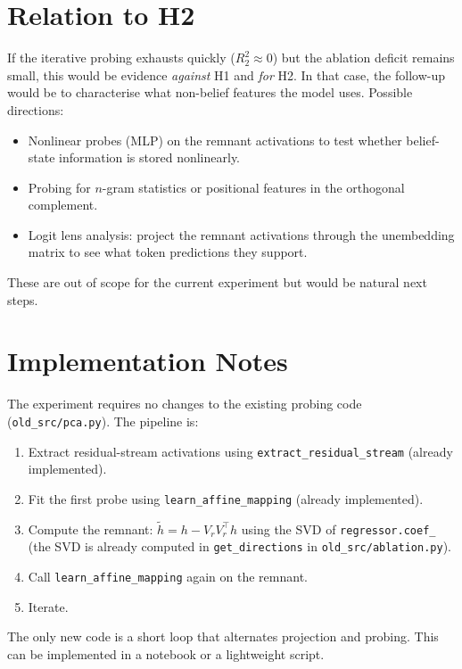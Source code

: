 \documentclass[11pt]{article}
\begin{document}
\section{Relation to H2}

If the iterative probing exhausts quickly ($R^2_2 \approx 0$) but the ablation deficit remains small, this would be evidence \emph{against} H1 and \emph{for} H2.  In that case, the follow-up would be to characterise what non-belief features the model uses.  Possible directions:
\begin{itemize}
  \item Nonlinear probes (MLP) on the remnant activations to test whether belief-state information is stored nonlinearly.
  \item Probing for $n$-gram statistics or positional features in the orthogonal complement.
  \item Logit lens analysis: project the remnant activations through the unembedding matrix to see what token predictions they support.
\end{itemize}

These are out of scope for the current experiment but would be natural next steps.

\section{Implementation Notes}

The experiment requires no changes to the existing probing code (\texttt{old\_src/pca.py}).  The pipeline is:
\begin{enumerate}
  \item Extract residual-stream activations using \texttt{extract\_residual\_stream} (already implemented).
  \item Fit the first probe using \texttt{learn\_affine\_mapping} (already implemented).
  \item Compute the remnant: $\tilde{h} = h - V_r V_r^\top h$ using the SVD of \texttt{regressor.coef\_} (the SVD is already computed in \texttt{get\_directions} in \texttt{old\_src/ablation.py}).
  \item Call \texttt{learn\_affine\_mapping} again on the remnant.
  \item Iterate.
\end{enumerate}

The only new code is a short loop that alternates projection and probing.  This can be implemented in a notebook or a lightweight script.
\end{document}
